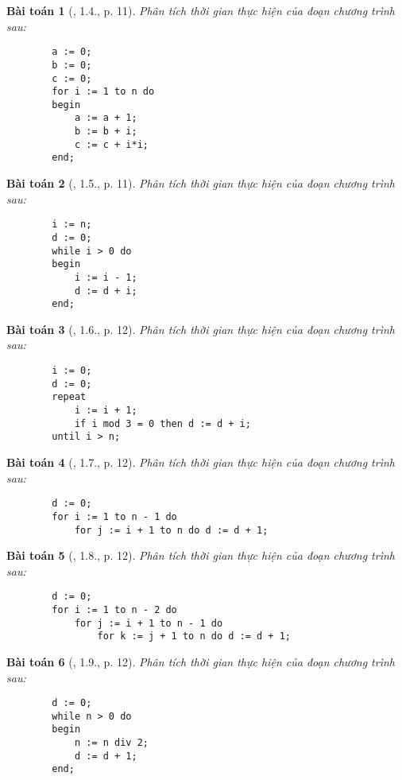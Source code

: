 \documentclass{article}
\newtheorem{baitoan}{Bài toán}
\begin{document}
\begin{baitoan}[\cite{TLGK_chuyen_Tin_quyen_1}, 1.4., p. 11]
	Phân tích thời gian thực hiện của đoạn chương trình sau:
	\begin{verbatim}
		a := 0;
		b := 0;
		c := 0;
		for i := 1 to n do
		begin
		    a := a + 1;
		    b := b + i;
		    c := c + i*i;
		end;
	\end{verbatim}
\end{baitoan}

\begin{baitoan}[\cite{TLGK_chuyen_Tin_quyen_1}, 1.5., p. 11]
	Phân tích thời gian thực hiện của đoạn chương trình sau:
	\begin{verbatim}
		i := n;
		d := 0;
		while i > 0 do
		begin
		    i := i - 1;
		    d := d + i;
		end;
	\end{verbatim}
\end{baitoan}

\begin{baitoan}[\cite{TLGK_chuyen_Tin_quyen_1}, 1.6., p. 12]
	Phân tích thời gian thực hiện của đoạn chương trình sau:
	\begin{verbatim}
		i := 0;
		d := 0;
		repeat
		    i := i + 1;
		    if i mod 3 = 0 then d := d + i;
		until i > n;
	\end{verbatim}
\end{baitoan}

\begin{baitoan}[\cite{TLGK_chuyen_Tin_quyen_1}, 1.7., p. 12]
	Phân tích thời gian thực hiện của đoạn chương trình sau:
	\begin{verbatim}
		d := 0;
		for i := 1 to n - 1 do
		    for j := i + 1 to n do d := d + 1;
	\end{verbatim}
\end{baitoan}

\begin{baitoan}[\cite{TLGK_chuyen_Tin_quyen_1}, 1.8., p. 12]
	Phân tích thời gian thực hiện của đoạn chương trình sau:
	\begin{verbatim}
		d := 0;
		for i := 1 to n - 2 do
		    for j := i + 1 to n - 1 do
		        for k := j + 1 to n do d := d + 1;
	\end{verbatim}
\end{baitoan}

\begin{baitoan}[\cite{TLGK_chuyen_Tin_quyen_1}, 1.9., p. 12]
	Phân tích thời gian thực hiện của đoạn chương trình sau:
	\begin{verbatim}
		d := 0;
		while n > 0 do
		begin
		    n := n div 2;
		    d := d + 1;
		end;
	\end{verbatim}
\end{baitoan}
\end{document}
